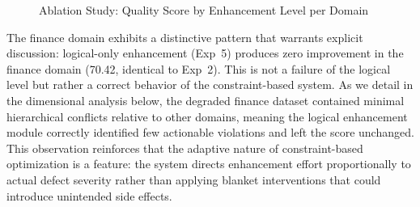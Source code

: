 \documentclass[runningheads]{llncs}
\begin{document}
\begin{figure}[H]
    \centering
    \caption{Ablation Study: Quality Score by Enhancement Level per Domain}
    \label{fig:ablation_bar}
\end{figure}

The finance domain exhibits a distinctive pattern that warrants explicit discussion: logical-only enhancement (Exp~5) produces zero improvement in the finance domain (70.42, identical to Exp~2). This is not a failure of the logical level but rather a correct behavior of the constraint-based system. As we detail in the dimensional analysis below, the degraded finance dataset contained minimal hierarchical conflicts relative to other domains, meaning the logical enhancement module correctly identified few actionable violations and left the score unchanged. This observation reinforces that the adaptive nature of constraint-based optimization is a feature: the system directs enhancement effort proportionally to actual defect severity rather than applying blanket interventions that could introduce unintended side effects.
\end{document}
